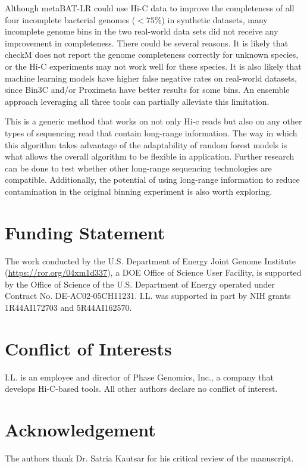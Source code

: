 \documentclass[fleqn,10pt,lineno]{wlpeerj}
\begin{document}
Although metaBAT-LR could use Hi-C data to improve the completeness of all four incomplete bacterial genomes ($<75\%$) in synthetic datasets, many incomplete genome bins in the two real-world data sets did not receive any improvement in completeness. There could be several reasons. It is likely that checkM does not report the genome completeness correctly for unknown species, or the Hi-C experiments may not work well for these species. It is also likely that machine learning models have higher false negative rates on real-world datasets, since Bin3C and/or Proximeta have better results for some bins. An ensemble approach leveraging all three tools can partially alleviate this limitation.  

This is a generic method that works on not only Hi-c reads but also on any other types of sequencing read that contain long-range information. The way in which this algorithm takes advantage of the adaptability of random forest models is what allows the overall algorithm to be flexible in application. Further research can be done to test whether other long-range sequencing technologies are compatible. Additionally, the potential of using long-range information to reduce contamination in the original binning experiment is also worth exploring.   

\section*{Funding Statement}
The work conducted by the U.S. Department of Energy Joint Genome Institute (\url{https://ror.org/04xm1d337}), a DOE Office of Science User Facility, is supported by the Office of Science of the U.S. Department of Energy operated under Contract No. DE-AC02-05CH11231. I.L. was supported in part by NIH grants 1R44AI172703 and 5R44AI162570.

\section*{Conflict of Interests}
I.L. is an employee and director of Phase Genomics, Inc., a company that develops Hi-C-based tools. All other authors declare no conflict of interest.

\section*{Acknowledgement}
The authors thank Dr. Satria Kautsar for his critical review of the manuscript. 


\end{document}
